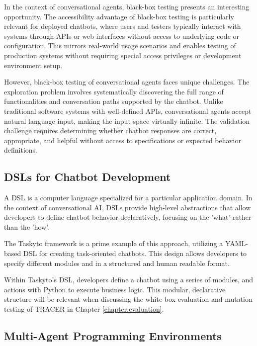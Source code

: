 In the context of conversational agents,
black-box testing presents an interesting opportunity.
The accessibility advantage of black-box testing
is particularly relevant for deployed chatbots,
where users and testers typically interact with systems
through \acp{API} or web interfaces without access to underlying code or configuration.
This mirrors real-world usage scenarios
and enables testing of production systems
without requiring special access privileges or development environment setup.


However, black-box testing of conversational agents faces unique challenges.
The exploration problem involves
systematically discovering the full range of functionalities
and conversation paths supported by the chatbot.
Unlike traditional software systems with well-defined \acp{API},
conversational agents accept natural language input,
making the input space virtually infinite.
The validation challenge requires determining
whether chatbot responses are correct, appropriate, and helpful
without access to specifications or expected behavior definitions.

\subsection{\aclp{DSL} for Chatbot Development}

A \acl{DSL} is a computer language
specialized for a particular application domain.
In the context of conversational AI,
\acp{DSL} provide high-level abstractions
that allow developers to define chatbot behavior declaratively,
focusing on the 'what' rather than the 'how'.

The Taskyto framework \autocite{sanchezcuadradoAutomatingDevelopmentTaskoriented2024} is a prime example of this approach,
utilizing a YAML-based \ac{DSL} for creating task-oriented chatbots.
This design allows developers to specify
different modules and in a structured and human readable format.

Within Taskyto's \ac{DSL}, developers define a chatbot using a series of modules,
and actions with Python to execute business logic.
This modular, declarative structure
will be relevant when discussing the white-box evaluation and mutation testing of \ac{TRACER} in Chapter \ref{chapter:evaluation}.

\subsection{Multi-Agent Programming Environments}

